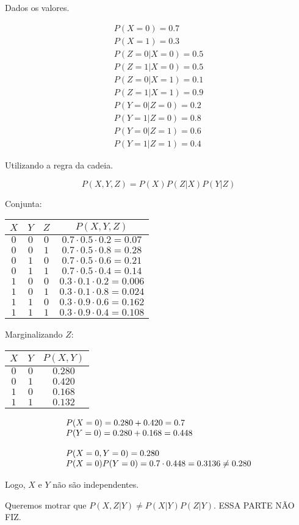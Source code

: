Dados os valores.

\[\begin{array}{l}
P(X = 0) = 0.7\\
P(X = 1) = 0.3\\
P(Z = 0|X = 0) = 0.5\\
P(Z = 1|X = 0) = 0.5\\
P(Z = 0|X = 1) = 0.1\\
P(Z = 1|X = 1) = 0.9\\
P(Y = 0|Z = 0) = 0.2\\
P(Y = 1|Z = 0) = 0.8\\
P(Y = 0|Z = 1) = 0.6\\
P(Y = 1|Z = 1) = 0.4
\end{array}\]

Utilizando a regra da cadeia.

\[P(X,Y,Z) = P(X)P(Z|X)P(Y|Z)\]

Conjunta:

\begin{tabular}{| c | c | c | c |}
$X$ & $Y$ & $Z$ & $P(X,Y,Z)$ \\ \hline
$0$ & $0$ & $0$ & $0.7 \cdot 0.5 \cdot 0.2 = 0.07$ \\
$0$ & $0$ & $1$ & $0.7 \cdot 0.5 \cdot 0.8 = 0.28$ \\
$0$ & $1$ & $0$ & $0.7 \cdot 0.5 \cdot 0.6 = 0.21$ \\
$0$ & $1$ & $1$ & $0.7 \cdot 0.5 \cdot 0.4 = 0.14$ \\
$1$ & $0$ & $0$ & $0.3 \cdot 0.1 \cdot 0.2 = 0.006$ \\
$1$ & $0$ & $1$ & $0.3 \cdot 0.1 \cdot 0.8 = 0.024$ \\
$1$ & $1$ & $0$ & $0.3 \cdot 0.9 \cdot 0.6 = 0.162$ \\
$1$ & $1$ & $1$ & $0.3 \cdot 0.9 \cdot 0.4 = 0.108$
\end{tabular}

Marginalizando $Z$:

\begin{tabular}{| c | c | c |}
$X$ & $Y$ & $P(X,Y)$ \\ \hline
$0$ & $0$ & $0.280$ \\
$0$ & $1$ & $0.420$ \\
$1$ & $0$ & $0.168$ \\
$1$ & $1$ & $0.132$
\end{tabular}

\[\begin{array}{l}
P(X = 0) = 0.280 + 0.420 = 0.7\\
P(Y = 0) = 0.280 + 0.168 = 0.448\\
\\
P(X = 0,Y = 0) = 0.280\\
P(X = 0)P(Y = 0) = 0.7 \cdot 0.448 = {\rm{0}}{\rm{.3136}} \ne 0.280
\end{array}\]

Logo, $X$ e $Y$ não são independentes.

Queremos motrar que $P(X,Z|Y) \ne P(X|Y)P(Z|Y)$. ESSA PARTE NÃO FIZ.

